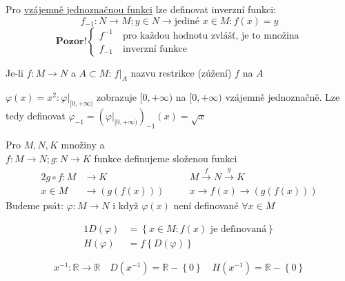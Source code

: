 Pro \hyperref[D-bijection]{vzájemně jednoznačnou funkci} lze definovat inverzní funkci:
\begin{equation}
    f_{-1}:N\rightarrow M; y\in N\rightarrow \text{jediné }x\in M: f(x)=y
\end{equation}
\[
\textbf{Pozor!}
\begin{cases}
    f^{-1} \quad\text{pro každou hodnotu zvlášť, je to množina} \\
    f_{-1} \quad\text{inverzní funkce}
\end{cases}
\]

\begin{definition}
    Je-li $f:M\rightarrow N$ a $A\subset M$: $f|_A$ nazvu restrikce (zúžení) $f$ na $A$
\end{definition}
\begin{example}
    $\varphi(x)=x^2: \varphi|_{[0,+\infty)}$ zobrazuje $[0,+\infty)$ na $[0,+\infty)$ vzájemně
        jednoznačně. Lze tedy definovat $\varphi_{-1}=(\varphi|_{[0,+\infty)})_{-1}(x)=\sqrt{x}$
\end{example}    
        
\begin{definition}
    Pro $M,N,K$ množiny a \\$f:M\rightarrow N; g:N\rightarrow K$ funkce definujeme složenou funkci
    \begin{alignat}{2}
        g\circ f: M&\rightarrow K &&\quad M\xrightarrow{f}N\xrightarrow{g}K \\
        x\in M &\rightarrow \left(g(f(x))\right) &&\quad x\rightarrow f(x)\rightarrow\left(g(f(x))\right)
    \end{alignat}
    Budeme psát: $\varphi :M\rightarrow N$ i když $\varphi(x)$ není definované $\forall x\in M$
\end{definition}

\begin{definition}
    \begin{alignat}{1}
        D(\varphi)&=\left\{x\in M: f(x) \text{ je definovaná}\right\} \\
        H(\varphi)&=f\left\{D(\varphi)\right\}
    \end{alignat}
\end{definition}
\begin{example}
    \begin{equation*}
        x^{-1}: \mathbb{R}\rightarrow\mathbb{R} \quad
            D\left(x^{-1}\right)=\mathbb{R}-\left\{0\right\} \quad
            H\left(x^{-1}\right)=\mathbb{R}-\left\{0\right\}
    \end{equation*}
\end{example}

